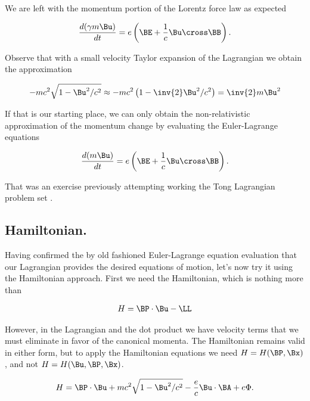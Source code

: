 We are left with the momentum portion of the Lorentz force law as expected

\begin{align}\label{eqn:hamiltonian:em5}
\frac{d(\gamma m \Bu)}{dt} = e \left( \BE + \frac{1}{c} \Bu \cross \BB \right).
\end{align}

Observe that with a small velocity Taylor expansion of the Lagrangian we obtain the approximation

\begin{align}\label{eqn:hamiltonian:em6}
-m c^2 \sqrt{ 1 -\Bu^2/c^2} \approx - m c^2 \left( 1 - \inv{2} \Bu^2/c^2 \right) = \inv{2} m \Bu^2
\end{align}

If that is our starting place, we can only obtain the non-relativistic approximation of the momentum change by evaluating the Euler-Lagrange equations

\begin{align}\label{eqn:hamiltonian:em5a}
\frac{d (m \Bu)}{dt} = e \left( \BE + \frac{1}{c} \Bu \cross \BB \right).
\end{align}

That was an exercise previously attempting working the Tong Lagrangian problem set \cite{TongMf1}.

\subsection{Hamiltonian.}

Having confirmed the by old fashioned Euler-Lagrange equation evaluation that our Lagrangian provides the desired equations of motion, let's now try it using the Hamiltonian approach.  First we need the Hamiltonian, which is nothing more than

\begin{align}\label{eqn:hamiltonian:em10}
H = \BP \cdot \Bu - \LL
\end{align}

However, in the Lagrangian and the dot product we have velocity terms that we must eliminate in favor of the canonical momenta.  The Hamiltonian remains valid in either form, but to apply the Hamiltonian equations we need $H = H(\BP, \Bx)$, and not $H = H(\Bu, \BP, \Bx)$.

\begin{align}\label{eqn:hamiltonian:em11}
H = \BP \cdot \Bu + m c^2 \sqrt{1 - \Bu^2/c^2} - \frac{e}{c} \Bu \cdot \BA + e \Phi.
\end{align}

